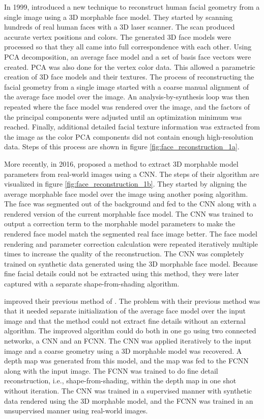 In 1999, \textcite{Blanz1999} introduced a new technique to reconstruct human facial geometry from a single image using a 3D morphable face model. They started by scanning hundreds of real human faces with a 3D laser scanner. The scan produced accurate vertex positions and colors. The generated 3D face models were processed so that they all came into full correspondence with each other. Using \ac{PCA} decomposition, an average face model and a set of basis face vectors were created. \ac{PCA} was also done for the vertex color data. This allowed a parametric creation of 3D face models and their textures. The process of reconstructing the facial geometry from a single image started with a coarse manual alignment of the average face model over the image. An analysis-by-synthesis loop was then repeated where the face model was rendered over the image, and the factors of the principal components were adjusted until an optimization minimum was reached. Finally, additional detailed facial texture information was extracted from the image as the color \ac{PCA} components did not contain enough high-resolution data. Steps of this process are shown in figure \ref{fig:face_reconstruction_1a}.

More recently, in 2016, \textcite{Richardson2016a} proposed a method to extract 3D morphable model parameters from real-world images using a \ac{CNN}. The steps of their algorithm are visualized in figure \ref{fig:face_reconstruction_1b}. They started by aligning the average morphable face model over the image using another posing algorithm. The face was segmented out of the background and fed to the \ac{CNN} along with a rendered version of the current morphable face model. The \ac{CNN} was trained to output a correction term to the morphable model parameters to make the rendered face model match the segmented real face image better. The face model rendering and parameter correction calculation were repeated iteratively multiple times to increase the quality of the reconstruction. The \ac{CNN} was completely trained on synthetic data generated using the 3D morphable face model. Because fine facial details could not be extracted using this method, they were later captured with a separate shape-from-shading algorithm.

\textcite{Richardson2016} improved their previous method of \cite{Richardson2016a}. The problem with their previous method was that it needed separate initialization of the average face model over the input image and that the method could not extract fine details without an external algorithm. The improved algorithm could do both in one go using two connected networks, a \ac{CNN} and an \ac{FCNN}. The \ac{CNN} was applied iteratively to the input image and a coarse geometry using a 3D morphable model was recovered. A depth map was generated from this model, and the map was fed to the \ac{FCNN} along with the input image. The \ac{FCNN} was trained to do fine detail reconstruction, i.e., shape-from-shading, within the depth map in one shot without iteration. The \ac{CNN} was trained in a supervised manner with synthetic data rendered using the 3D morphable model, and the \ac{FCNN} was trained in an unsupervised manner using real-world images.

